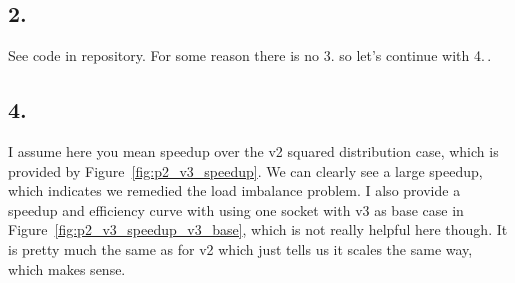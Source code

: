 \documentclass[a4paper, 11pt]{article}
\begin{document}
\subsection*{2.}
See code in repository. For some reason there is no 3. so let's continue with
4.\,.

\subsection*{4.}
I assume here you mean speedup over the v2 squared distribution case, which is
provided by Figure~\ref{fig:p2_v3_speedup}. We can clearly see a large speedup,
which indicates we remedied the load imbalance problem. I also provide a
speedup and efficiency curve with using one socket with v3 as base case in
Figure~\ref{fig:p2_v3_speedup_v3_base}, which is not really helpful here
though. It is pretty much the same as for v2 which just tells us it scales the
same way, which makes sense.
\end{document}
